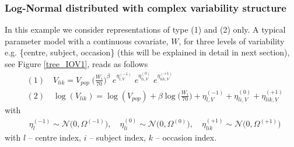 
\subsubsection{Log-Normal distributed with complex variability structure}
\label{subsec:logIOVCovariate}
In this example we consider representations of type (1) and (2) only. A typical parameter model with a continuous covariate, $W$, for three levels of variability e.g. \{centre, subject, occasion\} (this will be explained in detail in next section), see Figure \ref{tree_IOV1}, reads as follows
\begin{align*}
&(1)\quad V_{lik} = V_{pop} \; \big(\frac{W_i}{70}\big)^\beta \; e^{\eta_{l,V}^{(-1)}} \; e^{\eta_{li,V}^{(0)}} \; e^{\eta_{lik,V}^{(+1)}}   \\
&(2)\quad \log(V_{lik}) = \log(V_{pop}) + \beta\log\Big(\frac{W_i}{70}\Big) + \eta_{l,V}^{(-1)} + \eta_{li,V}^{(0)} + \eta_{lik,V}^{(+1)}
\end{align*}
with
\begin{align*}
 & \eta_l^{(-1)} \sim \mathcal{N}\big(0,\Omega^{(-1)}\big), \quad \eta_{li}^{(0)} \sim \mathcal{N}\big(0,\Omega^{(0)}\big),
\quad \eta_{lik}^{(+1)} \sim \mathcal{N}\big(0,\Omega^{(+1)}\big)
\end{align*}
with $l$ -- centre index, $i$ -- subject index, $k$ -- occasion index.


